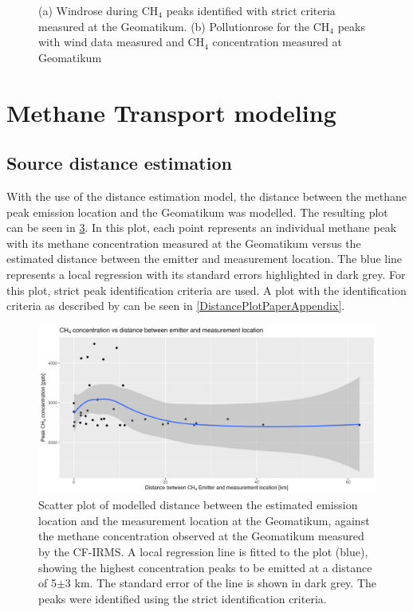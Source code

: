 \begin{figure}
\begin{subfigure}{.5\textwidth}
  \caption{}
  \label{PollutionrosePeaks}
\end{subfigure}
\caption[Windrose and Pollutionrose for total timeline at Geomatikum]{(a) Windrose during CH$_4$ peaks identified with strict criteria measured at the Geomatikum. (b) Pollutionrose for the CH$_4$ peaks with wind data measured and CH$_4$ concentration measured at Geomatikum}
\label{RosePeaksGeomatikum}
\end{figure}

\section{Methane Transport modeling}
\subsection{Source distance estimation}
With the use of the distance estimation model, the distance between the methane peak emission location and the Geomatikum was modelled. The resulting plot can be seen in \cref{DistancePlot}. In this plot, each point represents an individual methane peak with its methane concentration measured at the Geomatikum versus the estimated distance between the emitter and measurement location. The blue line represents a local regression with its standard errors highlighted in dark grey. For this plot, strict peak identification criteria are used. A plot with the identification criteria as described by \cite{Menoud.2021} can be seen in \cref{DistancePlotPaperAppendix}.
\begin{figure}[htbp]
 \centering
 \includegraphics[width=1\textwidth]{figures/Appendix/Transportmodel/14_Low_WL_to_Peak_distance_strict_peaks.png}
 \caption[Distance between estimated emitter and measurement location]{Scatter plot of modelled distance between the estimated emission location and the measurement location at the Geomatikum, against the methane concentration observed at the Geomatikum measured by the CF-IRMS. A local regression line is fitted to the plot (blue),  showing the highest concentration peaks to be emitted at a distance of 5$\pm$3 km. The standard error of the line is shown in dark grey. The peaks were identified using the strict identification criteria.}
 \label{DistancePlot}
\end{figure}
